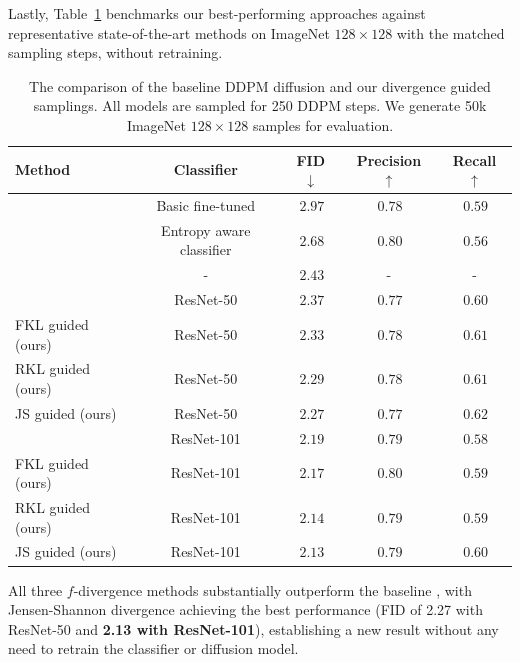 \documentclass{article}
\begin{document}
Lastly, Table~\ref{tab:fid50koff} benchmarks our best-performing approaches against representative state-of-the-art methods on ImageNet $128{\times}128$ with the matched sampling steps, without retraining.
\begin{table}[h]
	\centering
    \vspace{-1em}
	\caption{The comparison of the baseline DDPM diffusion and our divergence guided samplings. All models are sampled for 250 DDPM steps. We generate 50k ImageNet $128\times128$ samples for evaluation.}
	\vspace{5pt}
	\label{tab:fid50koff}
	\begin{tabular}{lcccc}
		\toprule
		\textbf{Method} & \textbf{Classifier} &\textbf{FID} $\downarrow$ & \textbf{Precision} $\uparrow$ & \textbf{Recall} $\uparrow$ \\
		\midrule
		\cite{dhariwal2021diffusion} & Basic fine-tuned &  $\,2.97 $ & $\,0.78$&$\,0.59$\\
        \cite{zheng2022entropy} & Entropy aware classifier &  $\,2.68 $ & $\,0.80$&$\,0.56$\\
		\cite{ho2022classifier} & - &  $\,2.43 $ & -&-\\
		\cite{ma2023elucidating} & ResNet-50 &  $\,2.37 $ &$\,0.77$ &$\,0.60$\\
		FKL guided (ours) & ResNet-50  &  $\,2.33$ & $\,0.78$&$\,0.61$\\
        RKL guided (ours) & ResNet-50  &  $\,2.29$ & $\,0.78$&$\,0.61$\\
        JS guided (ours) & ResNet-50  &  $\,2.27$ & $\,0.77$&$\,\mathbf{0.62}$\\
        \cite{ma2023elucidating} & ResNet-101 &  $\,2.19 $ &$\,0.79 $ &$\,0.58 $\\
		FKL guided (ours) & ResNet-101  &  $\,2.17$ &$\,\mathbf{0.80} $ &$\,0.59 $\\
        RKL guided (ours) & ResNet-101  &  $\,2.14$ &$\,0.79 $ &$\,0.59 $\\
        JS guided (ours) & ResNet-101  &  $\,\mathbf{2.13}$ &$\,0.79 $ &$\,0.60 $\\
		\bottomrule
	\end{tabular}
\end{table}
All three $f$-divergence methods substantially outperform the baseline \citep{ma2023elucidating}, with Jensen-Shannon divergence achieving the best performance (FID of 2.27 with ResNet-50 and \textbf{2.13 with ResNet-101}), establishing a new result without any need to retrain the classifier or diffusion model.
\end{document}
